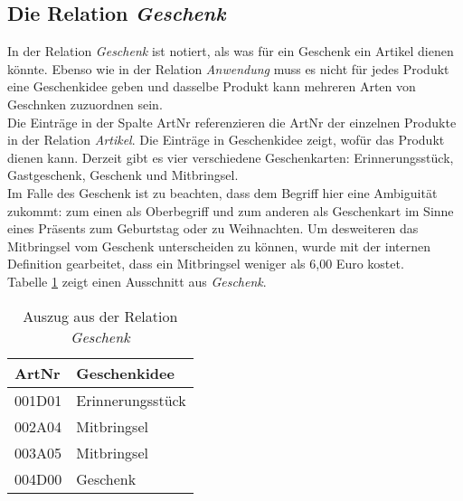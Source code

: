 \subsection{Die Relation \textit{Geschenk}}
\label{sec:Geschenk}
In der Relation \textit{Geschenk} ist notiert, als was für ein Geschenk ein Artikel dienen könnte. Ebenso wie in der Relation \textit{Anwendung} muss es nicht für jedes Produkt eine Geschenkidee geben und dasselbe Produkt kann mehreren Arten von Geschnken zuzuordnen sein.\\
Die Einträge in der Spalte ArtNr referenzieren die ArtNr der einzelnen Produkte in der Relation \textit{Artikel}. Die Einträge in Geschenkidee zeigt, wofür das Produkt dienen kann. Derzeit gibt es vier verschiedene Geschenkarten: Erinnerungsstück, Gastgeschenk, Geschenk und Mitbringsel.\\
Im Falle des Geschenk ist zu beachten, dass dem Begriff hier eine Ambiguität zukommt: zum einen als Oberbegriff und zum anderen als Geschenkart im Sinne eines Präsents zum Geburtstag oder zu Weihnachten. Um desweiteren das Mitbringsel vom Geschenk unterscheiden zu können, wurde mit der internen Definition gearbeitet, dass ein Mitbringsel weniger als 6,00 Euro kostet.\\
Tabelle \ref{BspGeschenk} zeigt einen Ausschnitt aus \textit{Geschenk}.
\begin{table}
\begin{center}
\begin{tabular}{|p{}|p{4cm}|}
	\hline
	ArtNr & Geschenkidee \\ \hline
	001D01 & Erinnerungsstück \\
	002A04 & Mitbringsel \\
	003A05 & Mitbringsel \\
	004D00 & Geschenk\\ \hline
	\end{tabular}
	\caption{Auszug aus der Relation \textit{Geschenk}}
\end{center}
\label{BspGeschenk}
\end{table}
\\


